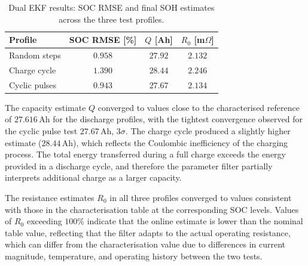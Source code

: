 \begin{table}[H]
    \centering
    \small
    \setlength{\arrayrulewidth}{0.7pt} 
    \renewcommand{\arraystretch}{1.3} 
    \begin{tabular}{|l|c|c|c|}
        \hline
        \textbf{Profile} & \textbf{SOC RMSE [\%]} & $Q$ [Ah] & $R_0$ [m$\Omega$] \\
        \hline
        Random steps  & $0.958$ & $27.92$  & $2.132$ \\
        \hline
        Charge cycle  & $1.390$ & $28.44$  & $2.246$ \\
        \hline
        Cyclic pulses & $0.943$ & $27.67$  & $2.134$ \\
        \hline
    \end{tabular}
    \caption{Dual EKF results: SOC RMSE and final SOH estimates across the three test profiles.}
    \label{tab:DualEKF_results}
\end{table}


The capacity estimate $Q$ converged to values close to the characterised reference of 
$27.616\,\text{Ah}$ for the discharge profiles, with the tightest convergence observed for the 
cyclic pulse test $27.67\,\text{Ah}$, $3\sigma$. The charge cycle 
produced a slightly higher estimate ($28.44\,\text{Ah}$), which reflects the Coulombic 
inefficiency of the charging process. The total energy transferred during a full charge 
exceeds the energy provided in a discharge cycle, and therefore the parameter filter partially interprets 
additional charge as a larger capacity.

The resistance estimates $R_0$ in all three profiles converged to values consistent with 
those in the characterisation table at the corresponding \ac{SOC} levels. Values of 
$R_0$ exceeding $100\%$ indicate that the online estimate is lower than the nominal 
table value, reflecting that the filter adapts to the actual operating resistance, which can 
differ from the characterisation value due to differences in current magnitude, temperature, and 
operating history between the two tests.

